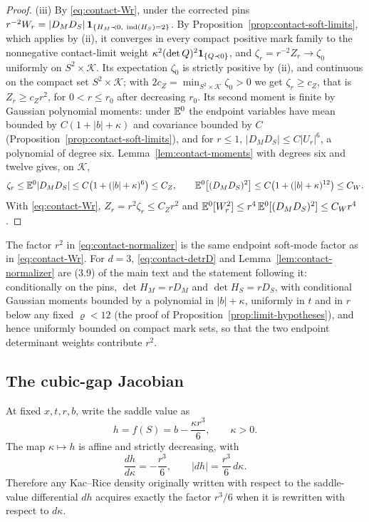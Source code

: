 \begin{proof}
(iii) By \eqref{eq:contact-Wr}, under the corrected pins $r^{-2}W_r=|D_MD_S|\,\ind_{\{H_M\prec0,\ \Ind(H_S)=2\}}$. By Proposition~\ref{prop:contact-soft-limits}, which applies by (ii), it converges in every compact positive mark family to the nonnegative contact-limit weight $\kappa^2(\det Q)^2\mathbf 1_{\{Q\prec0\}}$, and $\zeta_r=r^{-2}Z_r\to\zeta_0$ uniformly on $S^2\times\mathcal K$. Its expectation $\zeta_0$ is strictly positive by (ii), and continuous on the compact set $S^2\times\mathcal K$; with $2c_Z=\min_{S^2\times\mathcal K}\zeta_0>0$ we get $\zeta_r\ge c_Z$, that is $Z_r\ge c_Zr^2$, for $0<r\le r_0$ after decreasing $r_0$. Its second moment is finite by Gaussian polynomial moments: under $\mathbb E^0$ the endpoint variables have mean bounded by $C(1+|b|+\kappa)$ and covariance bounded by $C$ (Proposition~\ref{prop:contact-soft-limits}), and for $r\le1$, $|D_MD_S|\le C|U_r|^6$, a polynomial of degree six. Lemma~\ref{lem:contact-moments} with degrees six and twelve gives, on $\mathcal K$,
\[
\zeta_r\le\mathbb E^0|D_MD_S|\le C\bigl(1+(|b|+\kappa)^6\bigr)\le C_Z,\qquad\mathbb E^0\bigl[(D_MD_S)^2\bigr]\le C\bigl(1+(|b|+\kappa)^{12}\bigr)\le C_W .
\]
With \eqref{eq:contact-Wr}, $Z_r=r^2\zeta_r\le C_Zr^2$ and $\mathbb E^0[W_r^2]\le r^4\,\mathbb E^0[(D_MD_S)^2]\le C_Wr^4$.
\end{proof}

The factor $r^2$ in \eqref{eq:contact-normalizer} is the same endpoint soft-mode factor as in \eqref{eq:contact-Wr}. For $d=3$, \eqref{eq:contact-detrD} and Lemma~\ref{lem:contact-normalizer} are (3.9) of the main text and the statement following it: conditionally on the pins, $\det H_M=rD_M$ and $\det H_S=rD_S$, with conditional Gaussian moments bounded by a polynomial in $|b|+\kappa$, uniformly in $t$ and in $r$ below any fixed $\varrho<12$ (the proof of Proposition~\ref{prop:limit-hypotheses}), and hence uniformly bounded on compact mark sets, so that the two endpoint determinant weights contribute $r^2$.

\subsection{The cubic-gap Jacobian}\label{ssec:contact-gap}

\begin{lemma}\label{lem:contact-gap}
At fixed $x,t,r,b$, write the saddle value as
\begin{equation}\label{eq:contact-h}
h=f(S)=b-\frac{\kappa r^3}6,\qquad\kappa>0 .
\end{equation}
The map $\kappa\mapsto h$ is affine and strictly decreasing, with
\begin{equation}\label{eq:contact-gapjac}
\frac{dh}{d\kappa}=-\frac{r^3}6,\qquad|dh|=\frac{r^3}6\,d\kappa .
\end{equation}
Therefore any Kac--Rice density originally written with respect to the saddle-value differential $dh$ acquires exactly the factor $r^3/6$ when it is rewritten with respect to $d\kappa$.
\end{lemma}

